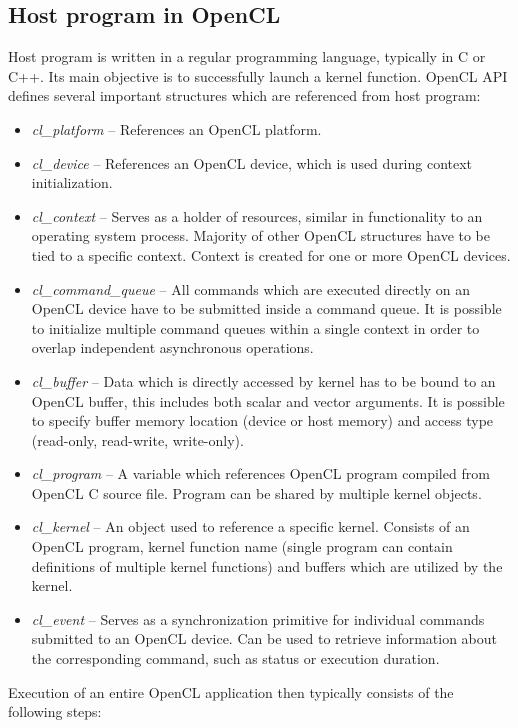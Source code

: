 \documentclass
[
    digital, %
    oneside, %
    table, %
    nolof, %
    nolot, %
    nocover %
]{fithesis3}
\begin{document}
\subsection{Host program in OpenCL}
Host program is written in a regular programming language, typically in C or C++. Its main objective is to successfully launch a kernel function.
OpenCL API defines several important structures which are referenced from host program:
\begin{itemize}
    \item \textit{cl\_platform} -- References an OpenCL platform.
    \item \textit{cl\_device} -- References an OpenCL device, which is used during context initialization.
    \item \textit{cl\_context} -- Serves as a holder of resources, similar in functionality to an operating system process. Majority of other OpenCL
    structures have to be tied to a specific context. Context is created for one or more OpenCL devices.
    \item \textit{cl\_command\_queue} -- All commands which are executed directly on an OpenCL device have to be submitted inside a command queue. It
    is possible to initialize multiple command queues within a single context in order to overlap independent asynchronous operations.
    \item \textit{cl\_buffer} -- Data which is directly accessed by kernel has to be bound to an OpenCL buffer, this includes both scalar and vector
    arguments. It is possible to specify buffer memory location (device or host memory) and access type (read-only, read-write, write-only).
    \item \textit{cl\_program} -- A variable which references OpenCL program compiled from OpenCL C source file. Program can be shared by multiple
    kernel objects.
    \item \textit{cl\_kernel} -- An object used to reference a specific kernel. Consists of an OpenCL program, kernel function name (single program
    can contain definitions of multiple kernel functions) and buffers which are utilized by the kernel.
    \item \textit{cl\_event} -- Serves as a synchronization primitive for individual commands submitted to an OpenCL device. Can be used to retrieve
    information about the corresponding command, such as status or execution duration.
\end{itemize}
Execution of an entire OpenCL application then typically consists of the following steps:
\end{document}
